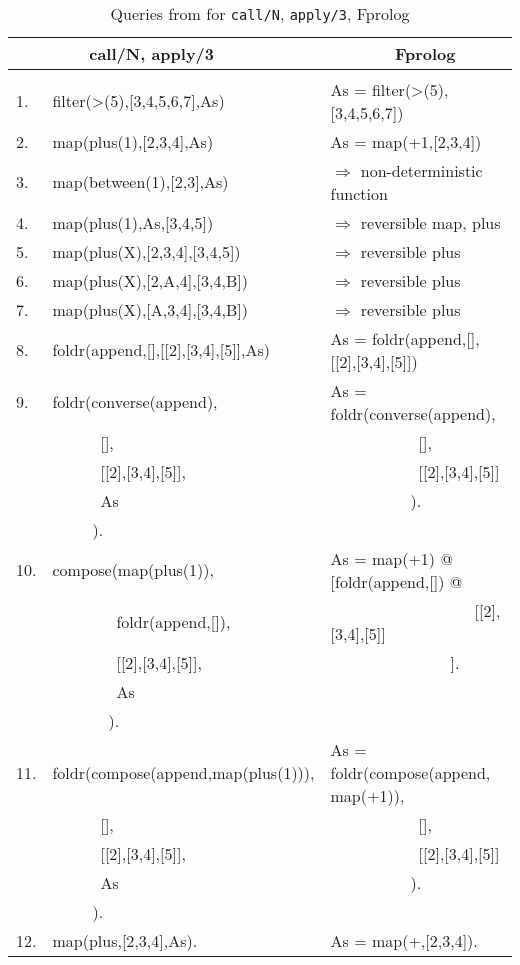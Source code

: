\documentclass[a4paper,11pt,twoside]{article}
\begin{document}
\begin{table}[htb]
{\footnotesize
\tt
\begin{tabular}{| l | l | l |}
\hline
   &~~~~call/N, apply/3          &~~~~~~~Fprolog \\
\hline
& & \\
1. &filter(>(5),[3,4,5,6,7],As)  &As = filter(>(5),[3,4,5,6,7])\\
2. &map(plus(1),[2,3,4],As)      &As = map(+1,[2,3,4])\\
3. &map(between(1),[2,3],As)     &$\Rightarrow$ non-deterministic function\\
4. &map(plus(1),As,[3,4,5])      &$\Rightarrow$ reversible map, plus\\
5. &map(plus(X),[2,3,4],[3,4,5]) &$\Rightarrow$ reversible plus\\
6. &map(plus(X),[2,A,4],[3,4,B]) &$\Rightarrow$ reversible plus\\
7. &map(plus(X),[A,3,4],[3,4,B]) &$\Rightarrow$ reversible plus\\
8. &foldr(append,[],[[2],[3,4],[5]],As) &As = foldr(append,[],[[2],[3,4],[5]]) \\
9. &foldr(converse(append),      &As = foldr(converse(append),\\
   &~~~~~~[],                    &~~~~~~~~~~~[],\\
   &~~~~~~[[2],[3,4],[5]],       &~~~~~~~~~~~[[2],[3,4],[5]]\\
   &~~~~~~As                     &~~~~~~~~~~).\\
   &~~~~~).                      & \\
10. &compose(map(plus(1)),       &As = map(+1) @ [foldr(append,[]) @\\
    &~~~~~~~~foldr(append,[]),   &~~~~~~~~~~~~~~~~~~[[2],[3,4],[5]]\\
    &~~~~~~~~[[2],[3,4],[5]],    &~~~~~~~~~~~~~~~].\\
    &~~~~~~~~As                  & \\
    &~~~~~~~).                   & \\
11. &foldr(compose(append,map(plus(1))), &As = foldr(compose(append, map(+1)),\\
    &~~~~~~[],                           &~~~~~~~~~~~[],\\
    &~~~~~~[[2],[3,4],[5]],              &~~~~~~~~~~~[[2],[3,4],[5]]\\
    &~~~~~~As                            &~~~~~~~~~~). \\
    &~~~~~).                             & \\
12. &map(plus,[2,3,4],As).       & As = map(+,[2,3,4]).\\
\hline
\end{tabular}
}
\label{call_apply_queries}
\caption{Queries from \cite{Nai96} for \texttt{call/N}, \texttt{apply/3}, Fprolog}
\end{table}
\end{document}
